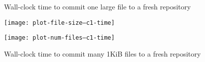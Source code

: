\begin{figure}
    \centering
    \begin{minipage}{.5\textwidth}

        \caption{Wall-clock time to commit one large file to a fresh repository}
        \label{fig:plot-file-size--c1-time}
        \centering
        \texttt{[image: plot-file-size--c1-time]}

    \end{minipage}%
    \begin{minipage}{.5\textwidth}

        \caption{Wall-clock time to commit many 1KiB files to a fresh repository}
        \label{fig:plot-num-files--c1-time}
        \centering
        \texttt{[image: plot-num-files--c1-time]}

    \end{minipage}
\end{figure}
